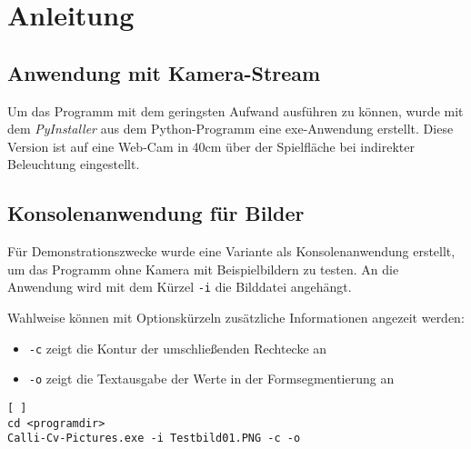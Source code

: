 
\section{Anleitung}
\label{sec:Anleitung}

\subsection{Anwendung mit Kamera-Stream}
Um das Programm mit dem geringsten Aufwand ausführen zu können, wurde mit dem \emph{PyInstaller} aus dem Python-Programm eine exe-Anwendung erstellt. Diese Version ist auf eine Web-Cam in 40cm über der Spielfläche bei indirekter Beleuchtung eingestellt. 


\subsection{Konsolenanwendung für Bilder}
Für Demonstrationszwecke wurde eine Variante als Konsolenanwendung erstellt, um das Programm ohne Kamera mit Beispielbildern zu testen. 
An die Anwendung wird mit dem Kürzel \lstinline{-i} die Bilddatei angehängt.
 
Wahlweise können mit Optionskürzeln zusätzliche Informationen angezeit werden:
\begin{itemize}
\item \lstinline{-c} zeigt die Kontur der umschließenden Rechtecke an 
\item \lstinline{-o} zeigt die Textausgabe der Werte in der Formsegmentierung an
\end{itemize}
\begin{lstlisting}[ ]
cd <programdir>
Calli-Cv-Pictures.exe -i Testbild01.PNG -c -o
\end{lstlisting}
